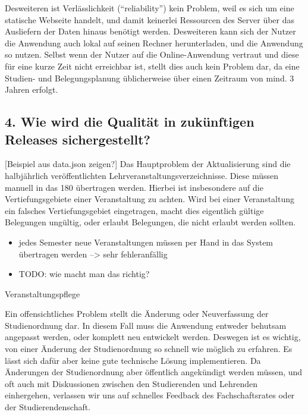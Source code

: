 \documentclass[ngerman]{article}
\begin{document}
Desweiteren ist Verlässlichkeit (``reliability'') kein Problem, weil es
sich um eine statische Webseite handelt, und damit keinerlei Ressourcen
des Server über das Ausliefern der Daten hinaus benötigt werden.
Desweiteren kann sich der Nutzer die Anwendung auch lokal auf seinen
Rechner herunterladen, und die Anwendung so nutzen. Selbst wenn der
Nutzer auf die Online-Anwendung vertraut und diese für eine kurze Zeit
nicht erreichbar ist, stellt dies auch kein Problem dar, da eine
Studien- und Belegungsplanung üblicherweise über einen Zeitraum von
mind. 3 Jahren erfolgt.

\subsection{4. Wie wird die Qualität in zukünftigen Releases
sichergestellt?}\label{wie-wird-die-qualituxe4t-in-zukuxfcnftigen-releases-sichergestellt}

{[}Beispiel aus data.json zeigen?{]} Das Hauptproblem der Aktualisierung
sind die halbjährlich veröffentlichten Lehrveranstaltungsverzeichnisse.
Diese müssen manuell in das 180 übertragen werden. Hierbei ist
insbesondere auf die Vertiefungsgebiete einer Veranstaltung zu achten.
Wird bei einer Veranstaltung ein falsches Vertiefungsgebiet eingetragen,
macht dies eigentlich gültige Belegungen ungültig, oder erlaubt
Belegungen, die nicht erlaubt werden sollten.

\begin{itemize}
\itemsep1pt\parskip0pt
\item
  jedes Semester neue Veranstaltungen müssen per Hand in das System
  übertragen werden --\textgreater{} sehr fehleranfällig
\item
  TODO: wie macht man das richtig?
\end{itemize}

Veranstaltungspflege

Ein offensichtliches Problem stellt die Änderung oder Neuverfassung der
Studienordnung dar. In diesem Fall muss die Anwendung entweder behutsam
angepasst werden, oder komplett neu entwickelt werden. Deswegen ist es
wichtig, von einer Änderung der Studienordnung so schnell wie möglich zu
erfahren. Es lässt sich dafür aber keine gute technische Lösung
implementieren. Da Änderungen der Studienordnung aber öffentlich
angekündigt werden müssen, und oft auch mit Diskussionen zwischen den
Studierenden und Lehrenden einhergehen, verlassen wir uns auf schnelles
Feedback des Fachschaftsrates oder der Studierendenschaft.
\end{document}
